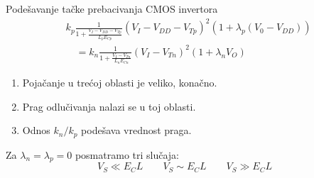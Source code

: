 \begin{frame}[label=09_2-s038]{Podešavanje tačke prebacivanja CMOS invertora}
\[\begin{aligned}&k_p\frac1{1+\frac{V_I-V_{DD}-V_{Tp}}{L_pE_{Cp}}}(V_I-V_{DD}-V_{Tp})^2\left(1+\lambda_p(V_0-V_{DD})\right)\\&\quad=k_n\frac1{1+\frac{V_I-V_{Tn}}{L_nE_{Cn}}}(V_I-V_{Tn})^2(1+\lambda_nV_O)\end{aligned}\]
\begin{enumerate}
\item Pojačanje u trećoj oblasti je veliko, konačno.
\item Prag odlučivanja nalazi se u toj oblasti.
\item Odnos $k_n/k_p$ podešava vrednost praga.
\end{enumerate}
Za $\lambda_n=\lambda_p=0$ posmatramo tri slučaja:
\[V_S\ll E_CL\qquad V_S\sim E_CL\qquad V_S\gg E_CL\]
\end{frame}
